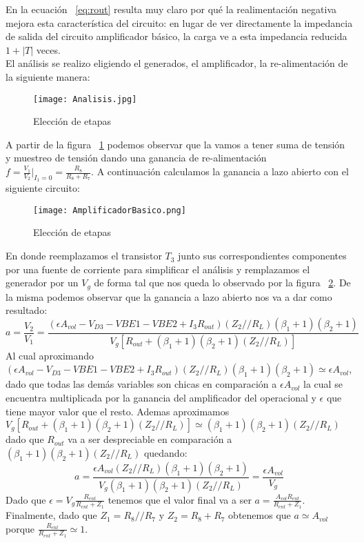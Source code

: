 \documentclass[e2_tp1_main.tex]{subfiles}
\begin{document}
En la ecuaci\'on ~\ref{eq:rout} resulta muy claro por qu\'e la realimentaci\'on negativa mejora esta caracter\'istica del circuito: en lugar de ver directamente la impedancia de salida del circuito amplificador b\'asico, la carga ve a esta impedancia reducida $1+|T|$ veces.\\
El an\'alisis se realizo eligiendo el generados, el amplificador, la re-alimentación de la siguiente manera:
\begin{figure}[H]
  \centering
   \texttt{[image: Analisis.jpg]}
   \caption{Elección de etapas}
   \label{fig:CircuitoEtapas}
\end{figure} 
A partir de la figura ~\ref{fig:CircuitoEtapas} podemos observar que la vamos a tener suma de tensión y muestreo de tensión dando una ganancia de re-alimentación $f=\frac{V_1}{V_2}|_{I_1=0}=\frac{R_8}{R_8+R_7}$.
A continuación calculamos la ganancia a lazo abierto con el siguiente circuito:
\begin{figure}[H]
  \centering
   \texttt{[image: AmplificadorBasico.png]}
   \caption{Elección de etapas}
   \label{fig:AmplificadorBasico}
\end{figure} 
En donde reemplazamos el transistor $T_3$ junto sus correspondientes componentes por una fuente de corriente para simplificar el análisis y remplazamos el generador por un $V_g$ de forma tal que nos queda lo observado por la figura ~\ref{fig:AmplificadorBasico}. De la misma podemos observar que la ganancia a lazo abierto nos va a dar como resultado: 
$$a=\frac{V_2}{V_1}=\frac{(\epsilon{}A_{vol}-V_{D3}-V{BE1}-V{BE2}+I_3R_{out})(Z_2//R_L)(\beta_1+1)(\beta_2+1)}{V_g[R_{out}+(\beta_1+1)(\beta_2+1)(Z_2//R_L)]}$$
Al cual aproximando $(\epsilon{}A_{vol}-V_{D3}-V{BE1}-V{BE2}+I_3R_{out})(Z_2//R_L)(\beta_1+1)(\beta_2+1)\simeq\epsilon{}A_{vol}$, dado que todas las demás variables son chicas en comparación a $\epsilon{}A_{vol}$ la cual se encuentra multiplicada por la ganancia del amplificador del operacional y $\epsilon$ que tiene mayor valor que el resto. Ademas aproximamos $V_g[R_{out}+(\beta_1+1)(\beta_2+1)(Z_2//R_L)]\simeq(\beta_1+1)(\beta_2+1)(Z_2//R_L)$ dado que $R_{out}$ va a ser despreciable en comparación a $(\beta_1+1)(\beta_2+1)(Z_2//R_L)$ quedando:
$$a=\frac{\epsilon{}A_{vol}(Z_2//R_L)(\beta_1+1)(\beta_2+1)}{V_g(\beta_1+1)(\beta_2+1)(Z_2//R_L)}=\frac{\epsilon{}A_{vol}}{V_g}$$
Dado que $\epsilon{}=V_g\frac{R_{ent}}{R_{ent}+Z_1}$ tenemos que el valor final va a ser $a=\frac{A_{vol}R_{ent}}{R_{ent}+Z_1}$.
Finalmente, dado que $Z_1=R_8//R_7$ y $Z_2=R_8+R_7$ obtenemos que $a\simeq{}A_{vol}$ porque $\frac{R_{ent}}{R_{ent}+Z_1}\simeq1$.
\end{document}
